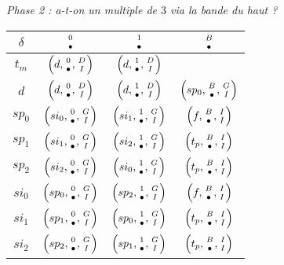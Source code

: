 \begin{center}
	\emph{\small Phase 2 : a-t-on un multiple de $3$ via la bande du haut ?}
	
	\smallskip
	\renewcommand{\arraystretch}{1.25}
	\begin{tabular}{|c||c|c|c||}
		\hline
		$\delta$ 
			& $\twocoord{0}{\bullet}$ 
			& $\twocoord{1}{\bullet}$ 
			& $\twocoord{B}{\bullet}$  \\
		\hline
		\hline
		$t_m$ 
			& $\left( d , \twocoord{0}{\bullet}, \twocoord{D}{I} \right)$ 
			& $\left( d , \twocoord{1}{\bullet}, \twocoord{D}{I} \right)$
			&  \\
		\hline
		$d$ 
			& $\left( d   , \twocoord{0}{\bullet}, \twocoord{D}{I} \right)$ 
			& $\left( d   , \twocoord{1}{\bullet}, \twocoord{D}{I} \right)$
			& $\left( sp_0, \twocoord{B}{\bullet}, \twocoord{G}{I} \right)$ \\
		\hline
		\hline
		$sp_0$ 
			& $\left( si_0 , \twocoord{0}{\bullet}, \twocoord{G}{I} \right)$ 
			& $\left( si_1 , \twocoord{1}{\bullet}, \twocoord{G}{I} \right)$
			& $\left( f    , \twocoord{B}{\bullet}, \twocoord{I}{I} \right)$ \\
		\hline
		$sp_1$ 
			& $\left( si_1 , \twocoord{0}{\bullet}, \twocoord{G}{I} \right)$ 
			& $\left( si_2 , \twocoord{1}{\bullet}, \twocoord{G}{I} \right)$
			& $\left( t_p  , \twocoord{B}{\bullet}, \twocoord{I}{I} \right)$ \\
		\hline
		$sp_2$ 
			& $\left( si_2 , \twocoord{0}{\bullet}, \twocoord{G}{I} \right)$ 
			& $\left( si_0 , \twocoord{1}{\bullet}, \twocoord{G}{I} \right)$
			& $\left( t_p  , \twocoord{B}{\bullet}, \twocoord{I}{I} \right)$ \\
		\hline
		\hline
		$si_0$ 
			& $\left( sp_0 , \twocoord{0}{\bullet}, \twocoord{G}{I} \right)$ 
			& $\left( sp_2 , \twocoord{1}{\bullet}, \twocoord{G}{I} \right)$
			& $\left( f    , \twocoord{B}{\bullet}, \twocoord{I}{I} \right)$ \\
		\hline
		$si_1$ 
			& $\left( sp_1 , \twocoord{0}{\bullet}, \twocoord{G}{I} \right)$ 
			& $\left( sp_0 , \twocoord{1}{\bullet}, \twocoord{G}{I} \right)$
			& $\left( t_p  , \twocoord{B}{\bullet}, \twocoord{I}{I} \right)$ \\
		\hline
		$si_2$ 
			& $\left( sp_2 , \twocoord{0}{\bullet}, \twocoord{G}{I} \right)$ 
			& $\left( sp_1 , \twocoord{1}{\bullet}, \twocoord{G}{I} \right)$
			& $\left( t_p  , \twocoord{B}{\bullet}, \twocoord{I}{I} \right)$ \\
		\hline
	\end{tabular}
	\renewcommand{\arraystretch}{1}
\end{center}




